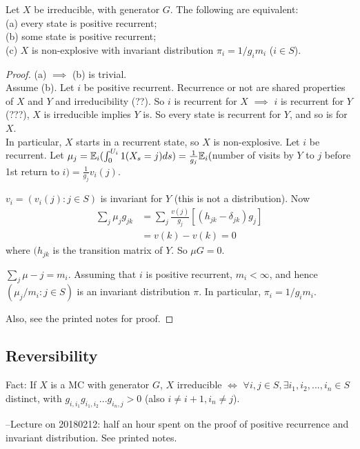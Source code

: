 \documentclass[a4paper]{article}
\begin{document}
\begin{thm}
Let $X$ be irreducible, with generator $G$. The following are equivalent:\\
(a) every state is positive recurrent;\\
(b) some state is positive recurrent;\\
(c) $X$ is non-explosive with invariant distribution $\pi_i = 1/g_im_i$ ($i \in S$).
\begin{proof}
(a) $\implies$ (b) is trivial.\\
Assume (b). Let $i$ be positive recurrent. Recurrence or not are shared properties of $X$ and $Y$ and irreducibility (??). So $i$ is recurrent for $X$ $\implies$ $i$ is recurrent for $Y$ (???), $X$ is irreducible implies $Y$ is. So every state is recurrent for $Y$, and so is for $X$.\\
In particular, $X$ starts in a recurrent state, so $X$ is non-explosive. Let $i$ be recurrent. Let $\mu_j = \mathbb{E}_i (\int_0^{U_i} 1(X_s = j) ds) = \frac{1}{g_j} \mathbb{E}_i ($number of visits by $Y$ to $j$ before 1st return to $i) = \frac{1}{g_j} v_i(j)$.

$v_i = (v_i(j) : j \in S)$ is invariant for $Y$ (this is not a distribution). Now
\begin{equation*}
\begin{aligned}
\sum_j \mu_j g_{jk} &= \sum_j \frac{v(j)}{g_j} [(h_{jk}-\delta_{jk})g_j] \\
&= v(k) - v(k) = 0
\end{aligned}
\end{equation*}
where $(h_{jk}$ is the transition matrix of $Y$. So $\mu G = 0$. 

$\sum_j \mu-j = m_i$.  Assuming that $i$ is positive recurrent, $m_i < \infty$, and hence $(\mu_j/m_i:j \in S)$ is an invariant distribution $\pi$. In particular, $\pi_i = 1/g_i m_i$.

Also, see the printed notes for proof.
\end{proof}
\end{thm}

\subsection{Reversibility}
Fact: If $X$ is a MC with generator $G$, $X$ irreducible $\iff$ $\forall i,j \in S, \exists i_1,i_2,...,i_n \in S$ distinct, with $g_{i,i_1}g_{i_1,i_2}...g_{i_n,j} > 0$ (also $i \neq i+1, i_n \neq j$).

--Lecture on 20180212: half an hour spent on the proof of positive recurrence and invariant distribution. See printed notes.
\end{document}
